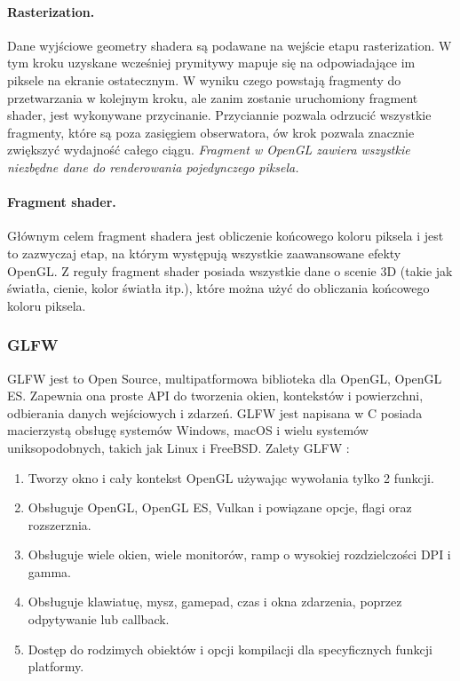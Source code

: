 \paragraph*{Rasterization.}
Dane wyjściowe geometry shadera są podawane na wejście etapu rasterization. W tym kroku uzyskane wcześniej prymitywy mapuje się na odpowiadające im piksele na ekranie ostatecznym. W wyniku czego powstają fragmenty do przetwarzania w kolejnym kroku, ale zanim zostanie uruchomiony fragment shader, jest wykonywane przycinanie. Przyciannie pozwala odrzucić wszystkie fragmenty, które są poza zasięgiem obserwatora, ów krok pozwala znacznie zwiększyć wydajność całego ciągu.
\textit{ Fragment w OpenGL zawiera wszystkie niezbędne dane do renderowania pojedynczego piksela.}
\paragraph*{Fragment shader.}
Głównym celem fragment shadera jest obliczenie końcowego koloru piksela i jest to zazwyczaj etap, na którym występują wszystkie zaawansowane efekty OpenGL. Z reguły fragment shader posiada wszystkie dane o scenie 3D (takie jak światła, cienie, kolor światła itp.), które można użyć do obliczania końcowego koloru piksela.

\subsubsection{GLFW} 
GLFW jest to Open Source, multipatformowa biblioteka dla OpenGL, OpenGL ES. Zapewnia ona proste API do tworzenia okien, kontekstów i powierzchni, odbierania danych wejściowych i zdarzeń. GLFW jest napisana w C posiada macierzystą obsługę systemów Windows, macOS i wielu systemów uniksopodobnych, takich jak Linux i FreeBSD. 
Zalety GLFW :
\begin{enumerate}
\item Tworzy okno i cały kontekst OpenGL używając wywołania tylko 2 funkcji.
\item Obsługuje OpenGL, OpenGL ES, Vulkan i powiązane opcje, flagi oraz rozszerznia.
\item Obsługuje wiele okien, wiele monitorów, ramp o wysokiej rozdzielczości DPI i gamma.
\item Obsługuje klawiatuę, mysz, gamepad, czas i okna zdarzenia, poprzez odpytywanie lub callback.
\item Dostęp do rodzimych obiektów i opcji kompilacji dla specyficznych funkcji platformy.
\end{enumerate} 

